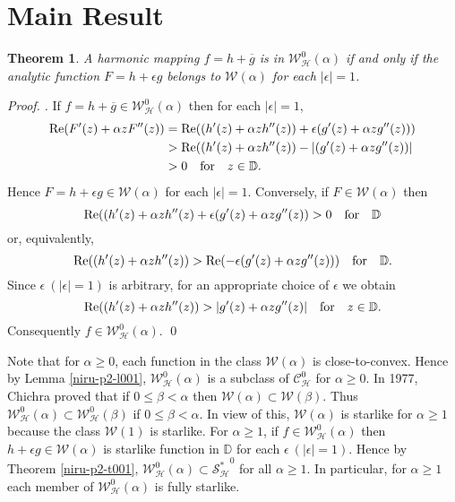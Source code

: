 \documentclass[a4paper,12pt]{amsart}
\theoremstyle{plain}
\newtheorem{thm}[equation]{Theorem}
\theoremstyle{definition}
\newenvironment{pf}[1][]{ \vskip 3mm
 \noindent
 \ifthenelse{\equal{#1}{}}  {{\slshape Proof. }}  {{\slshape #1.} } }{\qed\bigskip}
\begin{document}
\section{Main Result}

\begin{thm}\label{niru-p2-t005}
A harmonic mapping $f = h + \overline{g}$ is in $\mathcal{W}^0_{\mathcal{H}}(\alpha)$ if and only if the analytic function $F = h + \epsilon {g}$ belongs to $\mathcal{W}(\alpha)$ for each $|\epsilon| = 1$.
\end{thm}

\begin{pf}
If $f = h + \overline{g} \in \mathcal{W}^0_{\mathcal{H}}(\alpha)$ then for each $|\epsilon| = 1 $,
\begin{align*}
 {\rm Re}(F'(z) + \alpha z F''(z))&= {\rm Re}((h'(z) + \alpha z h''(z)) + \epsilon (g'(z) + \alpha z g''(z)))\\
 & > {\rm Re}((h'(z) + \alpha z h''(z)) - |(g'(z) + \alpha z g''(z))|\\
 & >0 \quad \mbox{for}\quad z\in\mathbb{D}.
\end{align*}
Hence $F = h + \epsilon {g} \in\mathcal{W}(\alpha)$ for each $|\epsilon| = 1$. Conversely, if $F\in\mathcal{W}(\alpha)$ then
$$
{\rm Re}((h'(z) + \alpha z h''(z) + \epsilon (g'(z) + \alpha z g''(z)) >0 \quad \mbox{for}\quad \mathbb{D}
$$
or, equivalently,
$$
{\rm Re}((h'(z) + \alpha z h''(z)) > {\rm Re}(-\epsilon(g'(z) + \alpha z g''(z))) \quad \mbox{for}\quad \mathbb{D}.
$$
Since $\epsilon~ (|\epsilon|= 1)$ is arbitrary, for an appropriate choice of $\epsilon$ we  obtain
$${\rm Re}((h'(z) + \alpha z h''(z)) > |g'(z) + \alpha z g''(z)| \quad \mbox{for} \quad z\in\mathbb{D}.
$$
Consequently  $f\in \mathcal{W}^0_{\mathcal{H}}(\alpha).$
\end{pf}

Note that for $\alpha \geq 0$, each function in the class $\mathcal{W}(\alpha)$ is close-to-convex. Hence by Lemma \ref{niru-p2-l001},  $\mathcal{W}^0_{\mathcal{H}}(\alpha)$ is a subclass of $\mathcal{C}^0_{\mathcal{H}}$ for $\alpha \geq 0$.
In 1977, Chichra \cite{Chichra-1977}  proved that  if  $0 \leq \beta< \alpha$ then $\mathcal{W}(\alpha)\subset \mathcal{W}(\beta) $. Thus $\mathcal{W}^0_{\mathcal{H}}(\alpha)\subset \mathcal{W}^0_{\mathcal{H}}(\beta) $ if $0 \leq \beta< \alpha$.
In view of this, $\mathcal{W}(\alpha)$ is starlike for $\alpha\geq 1$ because the class $\mathcal{W}(1)$ is starlike.
For $\alpha \geq 1$, if $f\in\mathcal{W}^0_{\mathcal{H}}(\alpha)$ then $h + \epsilon {g} \in\mathcal{W}(\alpha) $ is starlike function in $\mathbb{D}$ for each $\epsilon~ (|\epsilon|=1)$. Hence by Theorem \ref{niru-p2-t001}, $\mathcal{W}^0_{\mathcal{H}}(\alpha)\subset \mathcal{S^*_H}^0$ for all $\alpha \geq 1$. In particular, for $\alpha \geq 1$ each member of $\mathcal{W}^0_{\mathcal{H}}(\alpha)$ is fully starlike.
\end{document}
